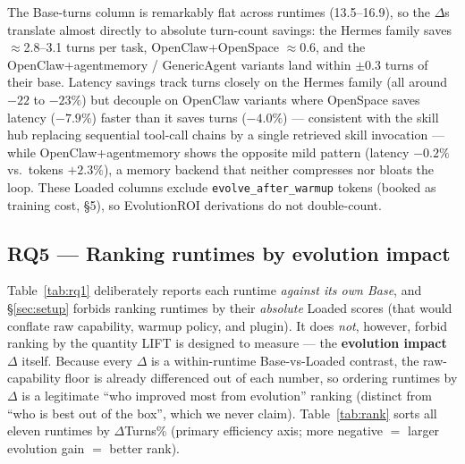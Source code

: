 \documentclass{article}
\begin{document}
The Base-turns column is remarkably flat across runtimes (13.5--16.9), so the $\Delta$s translate almost directly to absolute turn-count savings: the Hermes family saves $\approx$2.8--3.1 turns per task, OpenClaw+OpenSpace $\approx$0.6, and the OpenClaw+agentmemory / GenericAgent variants land within $\pm$0.3 turns of their base. Latency savings track turns closely on the Hermes family (all around $-22$ to $-23\%$) but decouple on OpenClaw variants where OpenSpace saves latency ($-7.9\%$) faster than it saves turns ($-4.0\%$) --- consistent with the skill hub replacing sequential tool-call chains by a single retrieved skill invocation --- while OpenClaw+agentmemory shows the opposite mild pattern (latency $-0.2\%$ vs.\ tokens $+2.3\%$), a memory backend that neither compresses nor bloats the loop. These Loaded columns exclude \texttt{evolve\_after\_warmup} tokens (booked as training cost, \S5), so EvolutionROI derivations do not double-count.

\subsection{RQ5 --- Ranking runtimes by evolution impact}
\label{sec:rq-ranking}

Table~\ref{tab:rq1} deliberately reports each runtime \emph{against its own Base}, and \S\ref{sec:setup} forbids ranking runtimes by their \emph{absolute} Loaded scores (that would conflate raw capability, warmup policy, and plugin). It does \emph{not}, however, forbid ranking by the quantity LIFT is designed to measure --- the \textbf{evolution impact} $\Delta$ itself. Because every $\Delta$ is a within-runtime Base-vs-Loaded contrast, the raw-capability floor is already differenced out of each number, so ordering runtimes by $\Delta$ is a legitimate ``who improved most from evolution'' ranking (distinct from ``who is best out of the box'', which we never claim). Table~\ref{tab:rank} sorts all eleven runtimes by $\Delta$Turns\% (primary efficiency axis; more negative $=$ larger evolution gain $=$ better rank).
\end{document}
